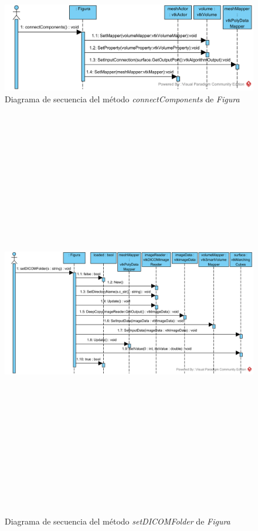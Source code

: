 \begin{figure}[H]
	\centering
	\includegraphics[width=12cm]{imagenes/diagramas/secuencia/Figura_ConnectComponents}
	\caption{Diagrama de secuencia del método \textit{connectComponents} de \textit{Figura}}
	\label{fig:diagrama_secuencia_figura_connectcomponents}
\end{figure}

\begin{figure}[H]
	\centering
	\includegraphics[angle=90,height=18cm]{imagenes/diagramas/secuencia/Figura_SetDicomFolder}
	\caption{Diagrama de secuencia del método \textit{setDICOMFolder} de \textit{Figura}}
	\label{fig:diagrama_secuencia_figura_setdicomfolder}
\end{figure}

